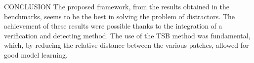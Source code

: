 \begin{frame}{CONCLUSION}
    The proposed framework, from the results obtained in the benchmarks, seems 
    to be the best in solving the problem of distractors. The achievement of these 
    results were possible thanks to the integration of a verification and detecting 
    method. The use of the TSB method was fundamental, which, by reducing 
    the relative distance between the various patches, allowed for good model 
    learning.
\end{frame}